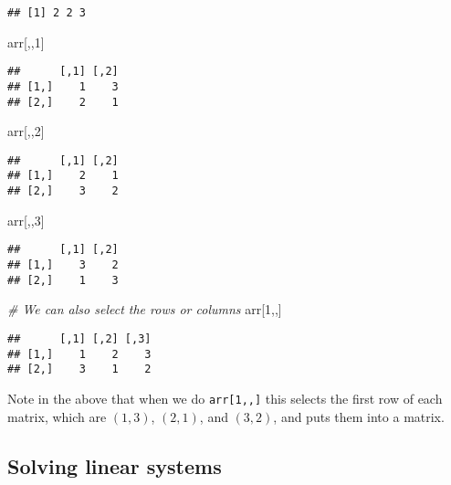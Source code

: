 \documentclass[]{article}
\newenvironment{Shaded}{\begin{snugshade}}{\end{snugshade}}
\newcommand{\CommentTok}[1]{\textcolor[rgb]{0.56,0.35,0.01}{\textit{#1}}}
\newcommand{\DecValTok}[1]{\textcolor[rgb]{0.00,0.00,0.81}{#1}}
\newcommand{\NormalTok}[1]{#1}
\begin{document}
\begin{verbatim}
## [1] 2 2 3
\end{verbatim}

\begin{Shaded}
\begin{Highlighting}[]
\NormalTok{arr[,,}\DecValTok{1}\NormalTok{]}
\end{Highlighting}
\end{Shaded}

\begin{verbatim}
##      [,1] [,2]
## [1,]    1    3
## [2,]    2    1
\end{verbatim}

\begin{Shaded}
\begin{Highlighting}[]
\NormalTok{arr[,,}\DecValTok{2}\NormalTok{]}
\end{Highlighting}
\end{Shaded}

\begin{verbatim}
##      [,1] [,2]
## [1,]    2    1
## [2,]    3    2
\end{verbatim}

\begin{Shaded}
\begin{Highlighting}[]
\NormalTok{arr[,,}\DecValTok{3}\NormalTok{]}
\end{Highlighting}
\end{Shaded}

\begin{verbatim}
##      [,1] [,2]
## [1,]    3    2
## [2,]    1    3
\end{verbatim}

\begin{Shaded}
\begin{Highlighting}[]
\CommentTok{# We can also select the rows or columns}
\NormalTok{arr[}\DecValTok{1}\NormalTok{,,]}
\end{Highlighting}
\end{Shaded}

\begin{verbatim}
##      [,1] [,2] [,3]
## [1,]    1    2    3
## [2,]    3    1    2
\end{verbatim}

Note in the above that when we do \texttt{arr{[}1,,{]}} this selects the
first row of each matrix, which are \((1,3)\), \((2,1)\), and \((3,2)\),
and puts them into a matrix.

\hypertarget{solving-linear-systems}{%
\subsection{Solving linear systems}\label{solving-linear-systems}}
\end{document}
